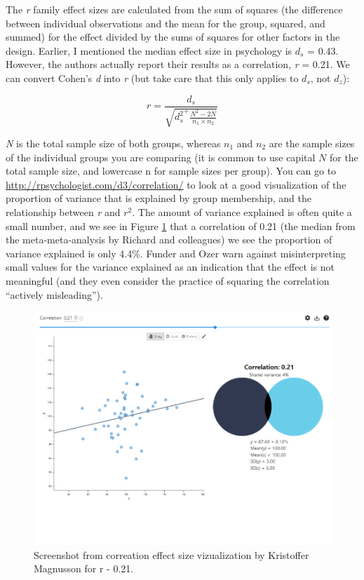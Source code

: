 \documentclass[
  oneside]{book}
\begin{document}
The \emph{r} family effect sizes are calculated from the sum of squares (the difference between individual observations and the mean for the group, squared, and summed) for the effect divided by the sums of squares for other factors in the design. Earlier, I mentioned the median effect size in psychology is \(d_s\) = 0.43. However, the authors actually report their results as a correlation, \emph{r} = 0.21. We can convert Cohen's \emph{d} into \emph{r} (but take care that this only applies to \(d_s\), not \(d_z\)):

\[r = \frac{d_s}{\sqrt{{d_s^{2}}^{+}\frac{N^{2} - 2N}{n_{1} \times n_{2}}}}\]

\emph{N} is the total sample size of both groups, whereas \(n_1\) and \(n_2\) are the sample sizes of the individual groups you are comparing (it is common to use capital \(N\) for the total sample size, and lowercase n for sample sizes per group). You can go to \url{http://rpsychologist.com/d3/correlation/} to look at a good visualization of the proportion of variance that is explained by group membership, and the relationship between \emph{r} and \(r^2\). The amount of variance explained is often quite a small number, and we see in Figure \ref{fig:sharedvariance} that a correlation of 0.21 (the median from the meta-meta-analysis by Richard and colleagues) we see the proportion of variance explained is only 4.4\%. Funder and Ozer \citeyearpar{funder_evaluating_2019} warn against misinterpreting small values for the variance explained as an indication that the effect is not meaningful (and they even consider the practice of squaring the correlation ``actively misleading'').

\begin{figure}

{\centering \includegraphics[width=1\linewidth]{images/sharedvariance} 

}

\caption{Screenshot from correation effect size vizualization by Kristoffer Magnusson for r - 0.21.}\label{fig:sharedvariance}
\end{figure}
\end{document}

